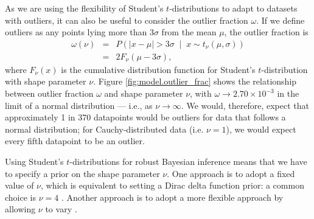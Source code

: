 \documentclass[fleqn,usenatbib]{mnras}
\newcommand{\studentt}[2]{t_\nu \left( #1, #2 \right)}
\begin{document}

As we are using the flexibility of Student's $t$-distributions to adapt to
datasets with outliers, it can also be useful to consider the outlier fraction
$\omega$. If we define outliers as any points lying more than $3\sigma$ from the
mean $\mu$, the outlier fraction is
\begin{eqnarray}
    \omega(\nu)
    &=& P\left(
        \left|x - \mu \right| > 3 \sigma \;
        \middle| \;
        x \sim \studentt{\mu}{\sigma}
    \right) \\
    &=& 2 F_\nu \left(\mu - 3 \sigma \right),
\end{eqnarray}
where $F_\nu(x)$ is the cumulative distribution function for Student's
$t$-distribution with shape parameter $\nu$. Figure \ref{fig:model.outlier_frac}
shows the relationship between outlier fraction $\omega$ and shape parameter
$\nu$, with $\omega \rightarrow 2.70 \times 10^{-3} $ in the limit of a normal
distribution --- i.e., as $\nu \rightarrow \infty$. We would, therefore, expect
that approximately 1 in 370 datapoints would be outliers for data that follows a
normal distribution\footnotemark; for Cauchy-distributed data (i.e. $\nu = 1$),
we would expect every fifth datapoint to be an outlier.



Using Student's $t$-distributions for robust Bayesian inference means that we
have to specify a prior on the shape parameter $\nu$. One approach is to adopt a
fixed value of $\nu$, which is equivalent to setting a Dirac delta function
prior: a common choice is $\nu = 4$ \citep[e.g.][]{Berger:1994, Gelman:2013}.
Another approach is to adopt a more flexible approach by allowing $\nu$ to vary
\citep[e.g.][]{Juarez:2010, Park:2017, Feeney:2018}.
\end{document}
